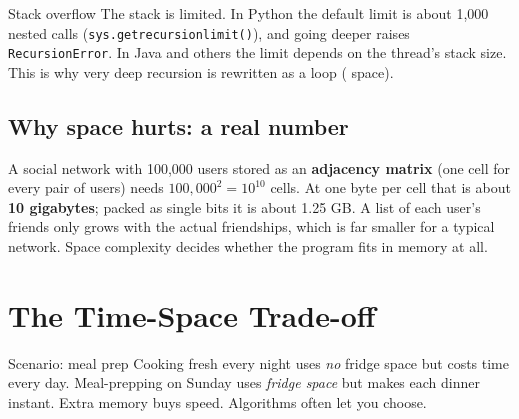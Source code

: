 \documentclass[11pt,a4paper]{article}
\newcommand{\Oone}{\On{1}}
\newcommand{\Olin}{\On{n}}
\newcommand{\Osq}{\On{n\textsuperscript{2}}}
\begin{document}
\begin{center}
\end{center}

\begin{callout}[alert]{Stack overflow}
The stack is limited. In Python the default limit is about 1,000 nested calls (\texttt{sys.getrecursionlimit()}), and going deeper raises \texttt{RecursionError}. In Java and others the limit depends on the thread's stack size. This is why very deep recursion is rewritten as a loop (\Oone{} space).
\end{callout}

\subsection{Why \Osq{} space hurts: a real number}
A social network with 100,000 users stored as an \textbf{adjacency matrix} (one cell for every pair of users) needs $100{,}000^2 = 10^{10}$ cells. At one byte per cell that is about \textbf{10 gigabytes}; packed as single bits it is about 1.25 GB. A list of each user's friends only grows with the actual friendships, which is far smaller for a typical network. Space complexity decides whether the program fits in memory at all.

\section{The Time-Space Trade-off}\label{s:trade}

\begin{callout}[coral]{Scenario: meal prep}
Cooking fresh every night uses \emph{no} fridge space but costs time every day. Meal-prepping on Sunday uses \emph{fridge space} but makes each dinner instant.
Extra memory buys speed. Algorithms often let you choose.
\end{callout}
\end{document}
